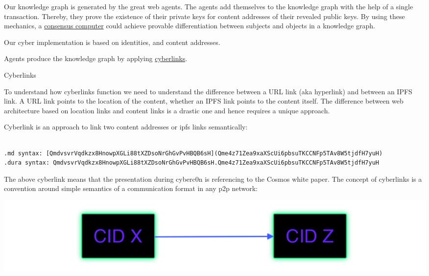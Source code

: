 \documentclass[8pt,oneside]{amsart}
\makeatletter
\newcommand{\linkred}[2]{\href{#1}{\color{red}{#2}}}
\renewcommand\subsection{\@startsection{subsection}
                                    {2}{\z@}
                                    {-3.25ex\@plus -1ex \@minus -.2ex}
                                    {0ex \@plus .2ex}
                                    {\play\Large}
                        }
\newcommand{\titleSection}[1]{\subsection{#1}}
\newcommand{\code}[1]{{\PlayBold #1}}
\newenvironment{Figure}
  {\par\medskip\noindent\minipage{\linewidth}}
  {\endminipage\par\medskip}
\makeatother
\begin{document}
Our knowledge graph is generated by the great web agents. The agents add themselves to the knowledge graph with the help of a single transaction. Thereby, they prove the existence of their private keys for content addresses of their revealed public keys. By using these mechanics, a {\hyperref[consensus-computer]{consensus computer}} could achieve provable differentiation between subjects and objects in a knowledge graph.

Our \code{cyber} implementation is based on \linkred{https://github.com/cosmos/cosmos-sdk}{cosmos-SDK} identities, and \linkred{https://github.com/multiformats/cid#cidv0}{CIDV1} content addresses.

Agents produce the knowledge graph by applying {\hyperref[cyberlinks]{cyberlinks}}.

\titleSection{Cyberlinks}\label{cyberlinks}

To understand how cyberlinks function we need to understand the difference between a URL link (aka hyperlink) and between an IPFS link. A URL link points to the location of the content, whether an IPFS link points to the content itself. The difference between web architecture based on location links and content links is a drastic one and hence requires a unique approach.

{Cyberlink} is an approach to link two content addresses or {ipfs links} semantically:

\begin{lstlisting}

.md syntax: [QmdvsvrVqdkzx8HnowpXGLi88tXZDsoNrGhGvPvHBQB6sH](Qme4z71Zea9xaXScUi6pbsuTKCCNFp5TAv8W5tjdfH7yuH)
.dura syntax: QmdvsvrVqdkzx8HnowpXGLi88tXZDsoNrGhGvPvHBQB6sH.Qme4z71Zea9xaXScUi6pbsuTKCCNFp5TAv8W5tjdfH7yuH
\end{lstlisting}

The above cyberlink means that the \linkred{https://github.com/cybercongress/cyberd}{cyberd} presentation during cyberc0n is referencing to the Cosmos white paper. The concept of cyberlinks is a convention around simple semantics of a communication format in any p2p network:

\begin{Figure}
    \centering
    \includegraphics[width=1\textwidth]{cyberlink.png}
\end{Figure}
\end{document}
